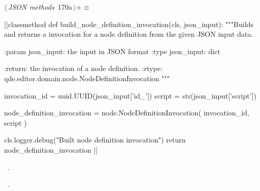 \documentclass[%
    a4paper,    %
    justified,  %
    nobib,      %
    openany     %
]{tufte-book}
\begin{document}
\begin{flushleft} \small
\begin{minipage}{\linewidth}\label{scrap201}\raggedright\small
{} $\langle\,${\itshape JSON methods}\nobreak\ {\footnotesize {170a}}$\,\rangle+\equiv$
\vspace{-1ex}
\begin{pythoncode}
|\normalfont{}\fontfamily{}|classmethod
def build_node_definition_invocation(cls, json_input):
    """Builds and returns a invocation for a node definition from the given
    JSON input data.

    :param json_input: the input in JSON format
    :type  json_input: dict

    :return: the invocation of a node definition.
    :rtype:  qde.editor.domain.node.NodeDefinitionInvocation
    """

    invocation_id = uuid.UUID(json_input['id_'])
    script        = str(json_input['script'])

    node_definition_invocation = node.NodeDefinitionInvocation(
        invocation_id,
        script
    )

    cls.logger.debug("Built node definition invocation")
    return node_definition_invocation
|\NWsep|
\end{pythoncode}
\vspace{1.5ex}
\footnotesize
\begin{list}{}{\setlength{\itemsep}{-\parsep}\setlength{\itemindent}{-\leftmargin}}
\item \NWtxtMacroDefBy\ .
\item \NWtxtMacroRefIn\ .

\item{}
\end{list}
\end{minipage}\vspace{4ex}
\end{flushleft}
\end{document}
